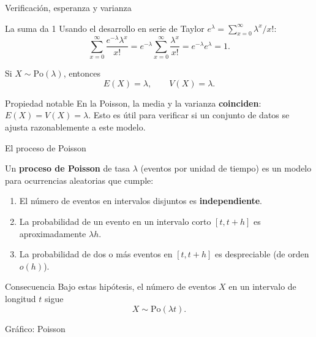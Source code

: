 \documentclass[aspectratio=169,11pt]{beamer}
\begin{document}
\begin{frame}{Verificación, esperanza y varianza}
\begin{block}{La suma da 1}
Usando el desarrollo en serie de Taylor $e^\lambda=\sum_{x=0}^\infty \lambda^x/x!$:
$$\sum_{x=0}^\infty \frac{e^{-\lambda}\lambda^x}{x!} = e^{-\lambda}\sum_{x=0}^\infty\frac{\lambda^x}{x!} = e^{-\lambda}e^{\lambda}=1.$$
\end{block}

\begin{theorem}
Si $X\sim\text{Po}(\lambda)$, entonces
$$E(X) = \lambda, \qquad V(X) = \lambda.$$
\end{theorem}

\begin{alertblock}{Propiedad notable}
En la Poisson, la media y la varianza \textbf{coinciden}: $E(X)=V(X)=\lambda$. Esto es útil para verificar si un conjunto de datos se ajusta razonablemente a este modelo.
\end{alertblock}
\end{frame}

\begin{frame}{El proceso de Poisson}
\begin{definition}
Un \textbf{proceso de Poisson} de tasa $\lambda$ (eventos por unidad de tiempo) es un modelo para ocurrencias aleatorias que cumple:
\begin{enumerate}
\item El número de eventos en intervalos disjuntos es \textbf{independiente}.
\item La probabilidad de un evento en un intervalo corto $[t,t+h]$ es aproximadamente $\lambda h$.
\item La probabilidad de dos o más eventos en $[t,t+h]$ es despreciable (de orden $o(h)$).
\end{enumerate}
\end{definition}

\begin{block}{Consecuencia}
Bajo estas hipótesis, el número de eventos $X$ en un intervalo de longitud $t$ sigue
$$X \sim \text{Po}(\lambda t).$$
\end{block}
\end{frame}

\begin{frame}{Gráfico: Poisson}
\begin{center}
\end{center}
\end{frame}
\end{document}
